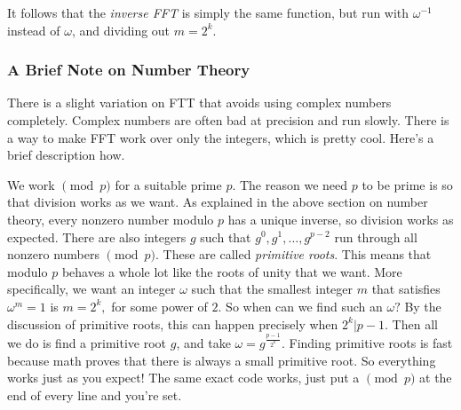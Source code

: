 \eject 

It follows that the \textit{inverse FFT} is simply the same function, but run with $\omega^{-1}$ instead of $\omega$, and dividing out $m=2^k$.

\subsubsection{A Brief Note on Number Theory}

There is a slight variation on FTT that avoids using complex numbers completely. Complex numbers are often bad at precision and run slowly. There is a way to make FFT work over only the integers, which is pretty cool. Here's a brief description how.

We work $\pmod{p}$ for a suitable prime $p$. The reason we need $p$ to be prime is so that division works as we want. As explained in the above section on number theory, every nonzero number modulo $p$ has a unique inverse, so division works as expected. There are also integers $g$ such that $g^0, g^1, \dots, g^{p-2}$ run through all nonzero numbers $\pmod{p}.$ These are called \emph{primitive roots}. This means that modulo $p$ behaves a whole lot like the roots of unity that we want. More specifically, we want an integer $\omega$ such that the smallest integer $m$ that satisfies $\omega^m = 1$ is $m = 2^k,$ for some power of $2.$ So when can we find such an $\omega?$ By the discussion of primitive roots, this can happen precisely when $2^k | p-1.$ Then all we do is find a primitive root $g$, and take $\omega = g^{\frac{p-1}{2^k}}.$ Finding primitive roots is fast because math proves that there is always a small primitive root. So everything works just as you expect! The same exact code works, just put a $\pmod{p}$ at the end of every line and you're set.
